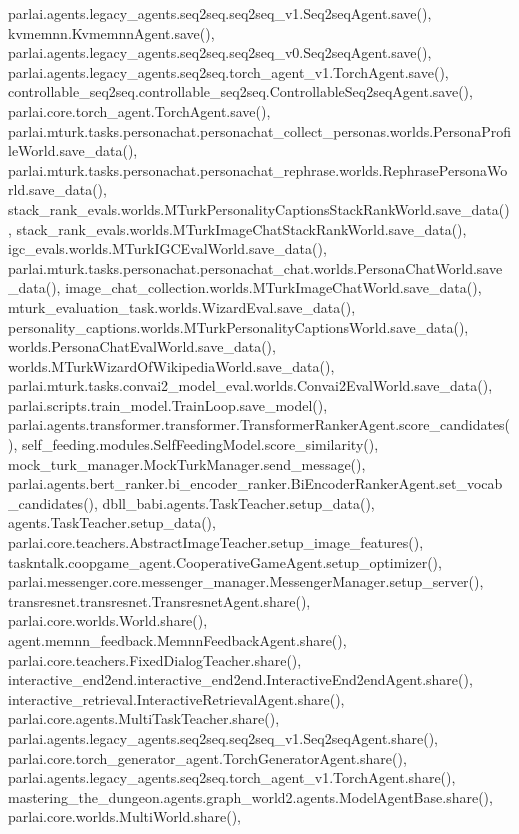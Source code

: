 parlai.\+agents.\+legacy\+\_\+agents.\+seq2seq.\+seq2seq\+\_\+v1.\+Seq2seq\+Agent.\+save(), kvmemnn.\+Kvmemnn\+Agent.\+save(), parlai.\+agents.\+legacy\+\_\+agents.\+seq2seq.\+seq2seq\+\_\+v0.\+Seq2seq\+Agent.\+save(), parlai.\+agents.\+legacy\+\_\+agents.\+seq2seq.\+torch\+\_\+agent\+\_\+v1.\+Torch\+Agent.\+save(), controllable\+\_\+seq2seq.\+controllable\+\_\+seq2seq.\+Controllable\+Seq2seq\+Agent.\+save(), parlai.\+core.\+torch\+\_\+agent.\+Torch\+Agent.\+save(), parlai.\+mturk.\+tasks.\+personachat.\+personachat\+\_\+collect\+\_\+personas.\+worlds.\+Persona\+Profile\+World.\+save\+\_\+data(), parlai.\+mturk.\+tasks.\+personachat.\+personachat\+\_\+rephrase.\+worlds.\+Rephrase\+Persona\+World.\+save\+\_\+data(), stack\+\_\+rank\+\_\+evals.\+worlds.\+M\+Turk\+Personality\+Captions\+Stack\+Rank\+World.\+save\+\_\+data(), stack\+\_\+rank\+\_\+evals.\+worlds.\+M\+Turk\+Image\+Chat\+Stack\+Rank\+World.\+save\+\_\+data(), igc\+\_\+evals.\+worlds.\+M\+Turk\+I\+G\+C\+Eval\+World.\+save\+\_\+data(), parlai.\+mturk.\+tasks.\+personachat.\+personachat\+\_\+chat.\+worlds.\+Persona\+Chat\+World.\+save\+\_\+data(), image\+\_\+chat\+\_\+collection.\+worlds.\+M\+Turk\+Image\+Chat\+World.\+save\+\_\+data(), mturk\+\_\+evaluation\+\_\+task.\+worlds.\+Wizard\+Eval.\+save\+\_\+data(), personality\+\_\+captions.\+worlds.\+M\+Turk\+Personality\+Captions\+World.\+save\+\_\+data(), worlds.\+Persona\+Chat\+Eval\+World.\+save\+\_\+data(), worlds.\+M\+Turk\+Wizard\+Of\+Wikipedia\+World.\+save\+\_\+data(), parlai.\+mturk.\+tasks.\+convai2\+\_\+model\+\_\+eval.\+worlds.\+Convai2\+Eval\+World.\+save\+\_\+data(), parlai.\+scripts.\+train\+\_\+model.\+Train\+Loop.\+save\+\_\+model(), parlai.\+agents.\+transformer.\+transformer.\+Transformer\+Ranker\+Agent.\+score\+\_\+candidates(), self\+\_\+feeding.\+modules.\+Self\+Feeding\+Model.\+score\+\_\+similarity(), mock\+\_\+turk\+\_\+manager.\+Mock\+Turk\+Manager.\+send\+\_\+message(), parlai.\+agents.\+bert\+\_\+ranker.\+bi\+\_\+encoder\+\_\+ranker.\+Bi\+Encoder\+Ranker\+Agent.\+set\+\_\+vocab\+\_\+candidates(), dbll\+\_\+babi.\+agents.\+Task\+Teacher.\+setup\+\_\+data(), agents.\+Task\+Teacher.\+setup\+\_\+data(), parlai.\+core.\+teachers.\+Abstract\+Image\+Teacher.\+setup\+\_\+image\+\_\+features(), taskntalk.\+coopgame\+\_\+agent.\+Cooperative\+Game\+Agent.\+setup\+\_\+optimizer(), parlai.\+messenger.\+core.\+messenger\+\_\+manager.\+Messenger\+Manager.\+setup\+\_\+server(), transresnet.\+transresnet.\+Transresnet\+Agent.\+share(), parlai.\+core.\+worlds.\+World.\+share(), agent.\+memnn\+\_\+feedback.\+Memnn\+Feedback\+Agent.\+share(), parlai.\+core.\+teachers.\+Fixed\+Dialog\+Teacher.\+share(), interactive\+\_\+end2end.\+interactive\+\_\+end2end.\+Interactive\+End2end\+Agent.\+share(), interactive\+\_\+retrieval.\+Interactive\+Retrieval\+Agent.\+share(), parlai.\+core.\+agents.\+Multi\+Task\+Teacher.\+share(), parlai.\+agents.\+legacy\+\_\+agents.\+seq2seq.\+seq2seq\+\_\+v1.\+Seq2seq\+Agent.\+share(), parlai.\+core.\+torch\+\_\+generator\+\_\+agent.\+Torch\+Generator\+Agent.\+share(), parlai.\+agents.\+legacy\+\_\+agents.\+seq2seq.\+torch\+\_\+agent\+\_\+v1.\+Torch\+Agent.\+share(), mastering\+\_\+the\+\_\+dungeon.\+agents.\+graph\+\_\+world2.\+agents.\+Model\+Agent\+Base.\+share(), parlai.\+core.\+worlds.\+Multi\+World.\+share(), 